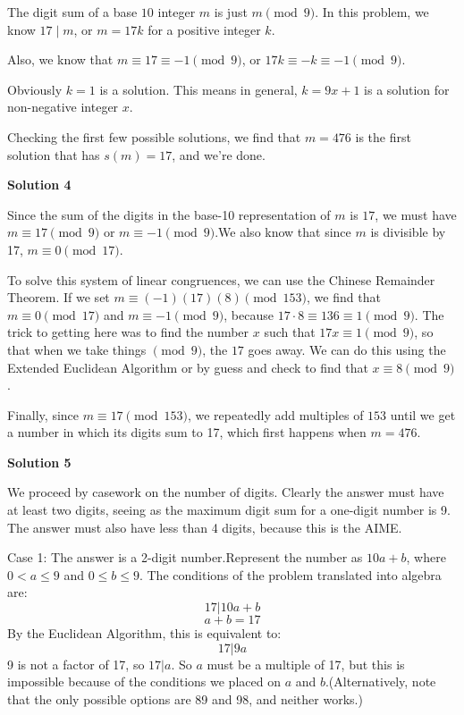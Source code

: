\begin{enumerate}
The digit sum of a base $10$ integer $m$ is just $m\pmod{9}$. In this problem, we know $17\mid m$, or $m=17k$ for a positive integer $k$.

 Also, we know that $m\equiv 17\equiv -1\pmod{9}$, or $17k\equiv -k\equiv -1\pmod{9}$.

 Obviously $k=1$ is a solution. This means in general, $k=9x+1$ is a solution for non-negative integer $x$.

 Checking the first few possible solutions, we find that $m=\boxed{476}$ is the first solution that has $s(m)=17$, and we're done.

 



\textbf{Solution 4}

Since the sum of the digits in the base-10 representation of $m$ is $17$, we must have $m\equiv 17 \pmod{9}$ or $m\equiv -1\pmod{9}$.We also know that since $m$ is divisible by 17, $m\equiv 0 \pmod{17}$.

 To solve this system of linear congruences, we can use the Chinese Remainder Theorem. If we set $m\equiv (-1)(17)(8)\pmod {153}$, we find that $m\equiv 0\pmod{17}$ and $m\equiv -1\pmod{9}$, because $17\cdot 8\equiv 136 \equiv 1\pmod{9}$. The trick to getting here was to find the number $x$ such that $17x\equiv 1\pmod{9}$, so that when we take things $\pmod{9}$, the $17$ goes away. We can do this using the Extended Euclidean Algorithm or by guess and check to find that $x\equiv 8\pmod{9}$.

 Finally, since $m\equiv 17\pmod{153}$, we repeatedly add multiples of $153$ until we get a number in which its digits sum to 17, which first happens when $m=\boxed{476}$.

 



\textbf{Solution 5}

We proceed by casework on the number of digits. Clearly the answer must have at least two digits, seeing as the maximum digit sum for a one-digit number is 9. The answer must also have less than 4 digits, because this is the AIME.

 Case 1: The answer is a 2-digit number.Represent the number as $10a + b$, where $0 < a \leq 9$ and $0 \leq b \leq 9$. The conditions of the problem translated into algebra are:
 \[17|10a+b\]
 \[a+b=17\]By the Euclidean Algorithm, this is equivalent to:
 \[17|9a\]9 is not a factor of 17, so $17|a$. So $a$ must be a multiple of 17, but this is impossible because of the conditions we placed on $a$ and $b$.(Alternatively, note that the only possible options are 89 and 98, and neither works.)


\end{enumerate}

